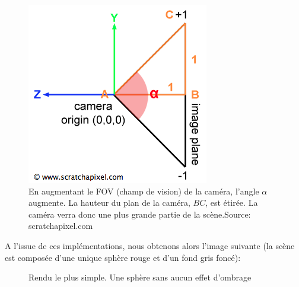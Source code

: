 \documentclass[11pt]{article}
\begin{document}
\begin{figure}[h!]
	\includegraphics{img/rt/fovCamera.png}

	\caption{En augmentant le FOV (champ de vision) de la caméra, l'angle $\alpha$ augmente. La hauteur du plan de la caméra, $BC$, est étirée. La caméra verra donc une plus grande partie de la scène.\break Source: scratchapixel.com}
	\label{fovCam}
\end{figure}
\FloatBarrier

A l'issue de ces implémentations, nous obtenons alors l'image suivante (la scène est composée d'une unique sphère rouge et d'un fond gris foncé):

\begin{figure}[h!]

	\caption{Rendu le plus simple. Une sphère sans aucun effet d'ombrage}
	\label{basicRender}
\end{figure}
\FloatBarrier
\end{document}
